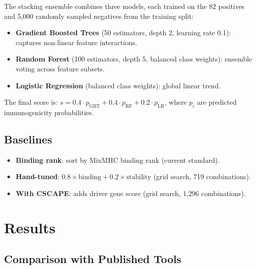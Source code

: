 \documentclass[11pt,twocolumn]{article}
\begin{document}
The stacking ensemble combines three models, each trained on the 82 positives and 5,000 randomly sampled negatives from the training split:

\begin{itemize}[leftmargin=*,topsep=0pt,itemsep=2pt]
\item \textbf{Gradient Boosted Trees} (50 estimators, depth 2, learning rate 0.1): captures non-linear feature interactions.
\item \textbf{Random Forest} (100 estimators, depth 5, balanced class weights): ensemble voting across feature subsets.
\item \textbf{Logistic Regression} (balanced class weights): global linear trend.
\end{itemize}

The final score is: $s = 0.4 \cdot p_{\text{GBT}} + 0.4 \cdot p_{\text{RF}} + 0.2 \cdot p_{\text{LR}}$, where $p_i$ are predicted immunogenicity probabilities.

\subsection{Baselines}

\begin{itemize}[leftmargin=*,topsep=0pt,itemsep=2pt]
\item \textbf{Binding rank}: sort by MixMHC binding rank (current standard).
\item \textbf{Hand-tuned}: $0.8 \times \text{binding} + 0.2 \times \text{stability}$ (grid search, 719 combinations).
\item \textbf{With CSCAPE}: adds driver gene score (grid search, 1,296 combinations).
\end{itemize}

\section{Results}

\subsection{Comparison with Published Tools}
\end{document}
